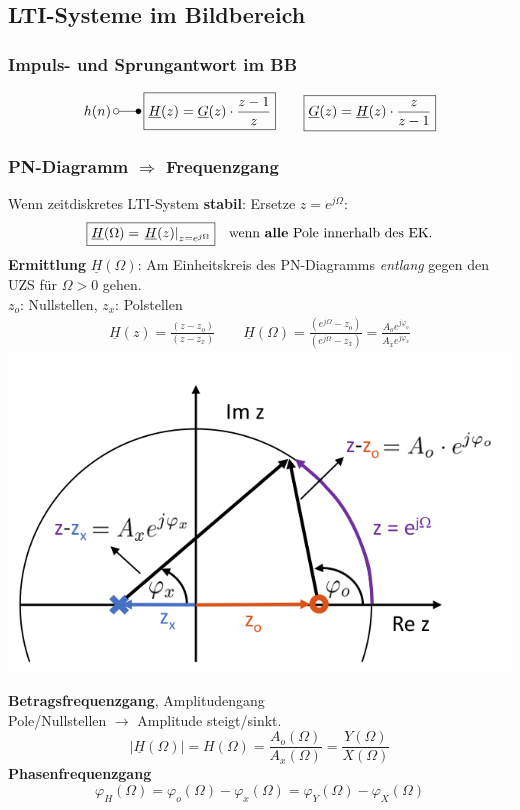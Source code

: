 \subsection{LTI-Systeme im Bildbereich}
\subsubsection{Impuls- und Sprungantwort im BB}
$$
	h(n) \, \laplace \, \boxed{\underline{H}(z) = \underline{G}(z) \cdot \frac{z-1}{z} } \qquad \boxed{
	\underline{G}(z) = \underline{H}(z) \cdot \frac{z}{z-1} }
$$




\subsubsection{PN-Diagramm $\Rightarrow$ Frequenzgang}
Wenn zeitdiskretes LTI-System \textbf{stabil}: Ersetze $z=e^{j\Omega}$:\\
\[ \boxed{
	\underline{H}(\Omega)=\left.\underline{H}(z)\right|_{z=e^{j \Omega}} } \quad \text{wenn \textbf{alle} Pole innerhalb des EK.}
\]
\textbf{Ermittlung} $\underline{H}(\Omega)$: Am Einheitskreis des PN-Diagramms \textit{entlang} gegen den UZS für $\Omega > 0$ gehen.\\

$z_o$: Nullstellen, \quad $z_x$: Polstellen
\begin{gather*}
	\underline{H}(z)=\frac{\left(z-z_{o}\right)}{\left(z-z_{x}\right)} \qquad
	\underline{H}(\Omega)=\frac{\left(e^{j \Omega}-z_{o}\right)}{\left(e^{j \Omega}-z_{x}\right)}=\frac{A_{o} e^{j \varphi_{o}}}{A_{x} e^{j \varphi_{x}}}
\end{gather*}
\centering
\includegraphics[width=0.7\columnwidth]{Bilder/PN-FreqGang}

\raggedright
\textbf{Betragsfrequenzgang}, Amplitudengang\\
Pole/Nullstellen $\rightarrow$ Amplitude steigt/sinkt.
\[
|\underline{H}(\Omega)| = H(\Omega)=\frac{A_{o}(\Omega)}{A_{x}(\Omega)} = \frac{Y(\Omega)}{X(\Omega)}
\]
\textbf{Phasenfrequenzgang}
\[
\varphi_{H}(\Omega)=\varphi_{o}(\Omega)-\varphi_{x}(\Omega) =\varphi_{Y}(\Omega)-\varphi_{X}(\Omega)
\]

